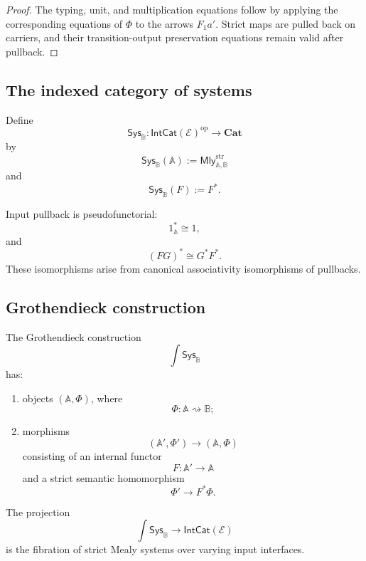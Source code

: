 \begin{proof}
The typing, unit, and multiplication equations follow by applying the
corresponding equations of \(\Phi\) to the arrows \(F_1a'\). Strict maps are
pulled back on carriers, and their transition-output preservation equations
remain valid after pullback.
\end{proof}

\subsection{The indexed category of systems}
\label{subsec:indexed-category-systems}

\begin{definition}
\label{def:input-indexed-system-category}
Define
\[
    \mathsf{Sys}_{\mathbb B}:
    \mathsf{IntCat}(\mathcal E)^{\mathrm{op}}
    \to
    \mathbf{Cat}
\]
by
\[
    \mathsf{Sys}_{\mathbb B}(\mathbb A)
    :=
    \mathsf{Mly}^{\mathrm{str}}_{\mathbb A,\mathbb B}
\]
and
\[
    \mathsf{Sys}_{\mathbb B}(F):=F^\ast.
\]
\end{definition}

Input pullback is pseudofunctorial:
\[
    1_{\mathbb A}^\ast\cong 1,
\]
and
\[
    (FG)^\ast\cong G^\ast F^\ast.
\]
These isomorphisms arise from canonical associativity isomorphisms of
pullbacks.

\subsection{Grothendieck construction}
\label{subsec:grothendieck-construction-systems}

\begin{definition}
\label{def:total-category-systems}
The Grothendieck construction
\[
    \int\mathsf{Sys}_{\mathbb B}
\]
has:
\begin{enumerate}
    \item objects \((\mathbb A,\Phi)\), where
    \[
        \Phi:\mathbb A\rightsquigarrow\mathbb B;
    \]
    \item morphisms
    \[
        (\mathbb A',\Phi')
        \longrightarrow
        (\mathbb A,\Phi)
    \]
    consisting of an internal functor
    \[
        F:\mathbb A'\to\mathbb A
    \]
    and a strict semantic homomorphism
    \[
        \Phi'\to F^\ast\Phi.
    \]
\end{enumerate}
\end{definition}

The projection
\[
    \int\mathsf{Sys}_{\mathbb B}
    \to
    \mathsf{IntCat}(\mathcal E)
\]
is the fibration of strict Mealy systems over varying input interfaces.

